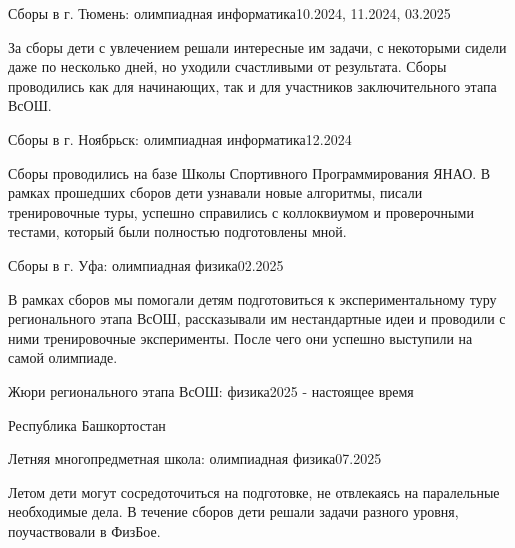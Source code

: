 \resumePOR
{Сборы в г. Тюмень: }{олимпиадная информатика}{10.2024, 11.2024, 03.2025}

За сборы дети с увлечением решали интересные им задачи, с некоторыми сидели даже по несколько дней, но уходили
счастливыми от результата. Сборы проводились как для начинающих, так и для участников заключительного этапа ВсОШ.

\resumePOR
{Сборы в г. Ноябрьск: }{олимпиадная информатика}{12.2024}

Сборы проводились на базе Школы Спортивного Программирования ЯНАО. В рамках прошедших сборов дети узнавали новые
алгоритмы, писали тренировочные туры, успешно справились с коллоквиумом и проверочными тестами, который были 
полностью подготовлены мной.

\resumePOR
{Сборы в г. Уфа: }{олимпиадная физика}{02.2025}

В рамках сборов мы помогали детям подготовиться к экспериментальному туру регионального этапа ВсОШ, рассказывали им 
нестандартные идеи и проводили с ними тренировочные эксперименты. После чего они успешно выступили на самой олимпиаде.

\resumePOR
{Жюри регионального этапа ВсОШ: }{физика}{2025 - настоящее время}

Республика Башкортостан

\resumePOR
{Летняя многопредметная школа: }{олимпиадная физика}{07.2025}

Летом дети могут сосредоточиться на подготовке, не отвлекаясь на паралельные необходимые дела. В течение сборов дети решали 
задачи разного уровня, поучаствовали в ФизБое.

\resumeSubHeadingListEnd
